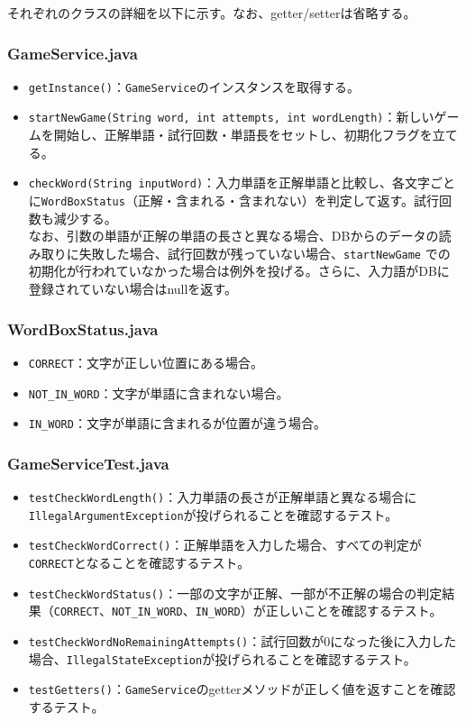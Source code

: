 \documentclass[a4j]{ujarticle}
\begin{document}
それぞれのクラスの詳細を以下に示す。なお、getter/setterは省略する。
\subsubsection{GameService.java}

\begin{itemize}
  \item \texttt{getInstance()}：\texttt{GameService}のインスタンスを取得する。
  \item \texttt{startNewGame(String word, int attempts, int wordLength)}：新しいゲームを開始し、正解単語・試行回数・単語長をセットし、初期化フラグを立てる。
  \item \texttt{checkWord(String inputWord)}：入力単語を正解単語と比較し、各文字ごとに\texttt{WordBoxStatus}（正解・含まれる・含まれない）を判定して返す。試行回数も減少する。\\
  なお、引数の単語が正解の単語の長さと異なる場合、DBからのデータの読み取りに失敗した場合、試行回数が残っていない場合、\texttt{startNewGame} での初期化が行われていなかった場合は例外を投げる。さらに、入力語がDBに登録されていない場合はnullを返す。
\end{itemize}

\subsubsection{WordBoxStatus.java}

\begin{itemize}
  \item \texttt{CORRECT}：文字が正しい位置にある場合。
  \item \texttt{NOT\_IN\_WORD}：文字が単語に含まれない場合。
  \item \texttt{IN\_WORD}：文字が単語に含まれるが位置が違う場合。
\end{itemize}

\subsubsection{GameServiceTest.java}

\begin{itemize}
  \item \texttt{testCheckWordLength()}：入力単語の長さが正解単語と異なる場合に\texttt{IllegalArgumentException}が投げられることを確認するテスト。
  \item \texttt{testCheckWordCorrect()}：正解単語を入力した場合、すべての判定が\texttt{CORRECT}となることを確認するテスト。
  \item \texttt{testCheckWordStatus()}：一部の文字が正解、一部が不正解の場合の判定結果（\texttt{CORRECT}、\texttt{NOT\_IN\_WORD}、\texttt{IN\_WORD}）が正しいことを確認するテスト。
  \item \texttt{testCheckWordNoRemainingAttempts()}：試行回数が0になった後に入力した場合、\texttt{IllegalStateException}が投げられることを確認するテスト。
  \item \texttt{testGetters()}：\texttt{GameService}のgetterメソッドが正しく値を返すことを確認するテスト。
\end{itemize}
\end{document}
